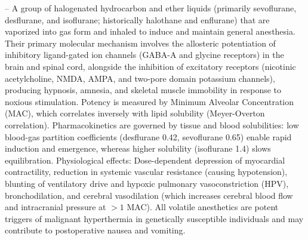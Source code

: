 -- A group of halogenated hydrocarbon and ether liquids (primarily sevoflurane, desflurane, and isoflurane; historically halothane and enflurane) that are vaporized into gas form and inhaled to induce and maintain general anesthesia. Their primary molecular mechanism involves the allosteric potentiation of inhibitory ligand-gated ion channels (GABA-A and glycine receptors) in the brain and spinal cord, alongside the inhibition of excitatory receptors (nicotinic acetylcholine, NMDA, AMPA, and two-pore domain potassium channels), producing hypnosis, amnesia, and skeletal muscle immobility in response to noxious stimulation. Potency is measured by Minimum Alveolar Concentration (MAC), which correlates inversely with lipid solubility (Meyer-Overton correlation). Pharmacokinetics are governed by tissue and blood solubilities: low blood-gas partition coefficients (desflurane 0.42, sevoflurane 0.65) enable rapid induction and emergence, whereas higher solubility (isoflurane 1.4) slows equilibration. Physiological effects: Dose-dependent depression of myocardial contractility, reduction in systemic vascular resistance (causing hypotension), blunting of ventilatory drive and hypoxic pulmonary vasoconstriction (HPV), bronchodilation, and cerebral vasodilation (which increases cerebral blood flow and intracranial pressure at $>1$ MAC). All volatile anesthetics are potent triggers of malignant hyperthermia in genetically susceptible individuals and may contribute to postoperative nausea and vomiting.

